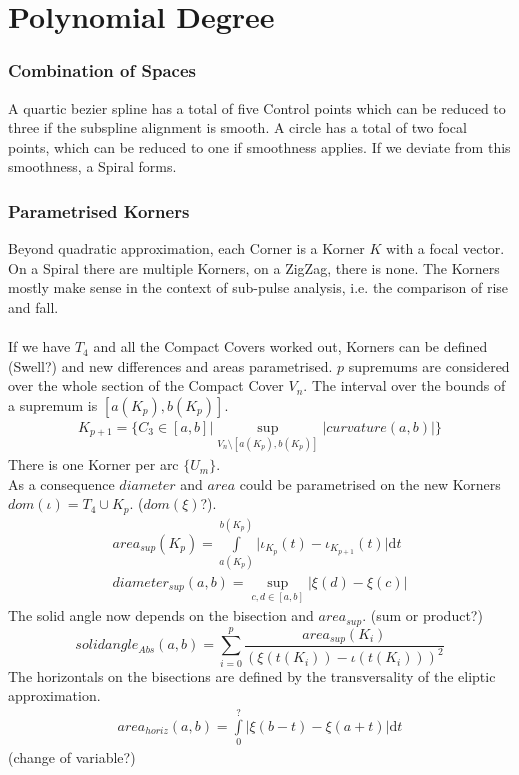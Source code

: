 \documentclass{report}
\begin{document}
\chapter{Polynomial Degree}
\subsection{Combination of Spaces}
A quartic bezier spline has a total of five Control points which can be reduced to three if the subspline alignment is smooth. A circle has a total of two focal points, which can be reduced to one if smoothness applies. If we deviate from this smoothness, a Spiral forms.
\subsection{Parametrised Korners}
Beyond quadratic approximation, each Corner is a Korner $K$ with a focal vector. On a Spiral there are multiple Korners, on a ZigZag, there is none. The Korners mostly make sense in the context of sub-pulse analysis, i.e. the comparison of rise and fall.\\\\
If we have $T_{4}$ and all the Compact Covers worked out, Korners can be defined (Swell?) and new differences and areas parametrised. $p$ supremums are considered over the whole section of the Compact Cover $V_{n}$. The interval over the bounds of a supremum is $[a(K_{p}),b(K_{p})]$.
\begin{align}
K_{p+1} = \{ C_{3} \in  [a,b]\vert \sup \limits _{V_{n} \setminus [a(K_{p}),b(K_{p})]} \lvert curvature(a,b) \rvert \}
\end{align}
There is one Korner per arc $\{U_{m}\}$.\\
As a consequence $diameter$ and $area$ could be parametrised on the new Korners $dom(\iota)=T_{4}\cup K_{p}$. ($dom(\xi)$?).\\
\begin{align}
area_{sup}(K_{p})=\int \limits _{a(K_{p})}^{b(K_{p})} \lvert \iota_{K_{p}}(t)-\iota_{K_{p+1}}(t) \rvert \mathrm{d}t\\
diameter_{sup}(a,b)=\sup \limits _{c,d \in [a,b]} \lvert \xi(d) - \xi(c) \rvert
\end{align}
The solid angle now depends on the bisection and $area_{sup}$. (sum or product?)
\begin{equation}
solidangle_{Abs}(a,b)=\sum \limits _{i=0}^{p} \frac{area_{sup}(K_{i})}{(\xi(t(K_{i}))-\iota(t(K_{i})))^2}
\end{equation}
The horizontals on the bisections are defined by the transversality of the eliptic approximation.
\begin{align}
area_{horiz}(a,b)=\int \limits _{0}^{?} \lvert \xi(b-t)-\xi(a+t) \rvert \mathrm{d}t
\end{align}
(change of variable?)
\end{document}
